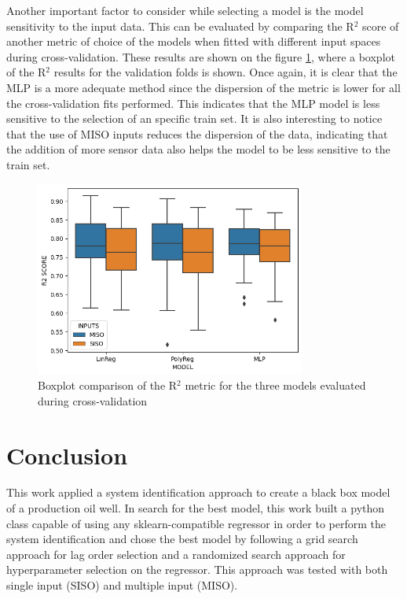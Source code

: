 \documentclass[conference]{IEEEtran}
\begin{document}
Another important factor to consider while selecting a model is the model sensitivity to the input data. This can be evaluated by comparing the R$^2$ score of another metric of choice of the models when fitted with different input spaces during cross-validation. These results are shown on the figure \ref{cv_stats}, where a boxplot of the R$^2$ results for the validation folds is shown. Once again, it is clear that the MLP is a more adequate method since the dispersion of the metric is lower for all the cross-validation fits performed. This indicates that the MLP model is less sensitive to the selection of an specific train set. It is also interesting to notice that the use of MISO inputs reduces the dispersion of the data, indicating that the addition of more sensor data also helps the model to be less sensitive to the train set.

\begin{figure}[htbp]
\centerline{\includegraphics[width=3.5in]{images/boxplot_cv.png}}
\caption{Boxplot comparison of the R$^2$ metric for the three models evaluated during cross-validation}
\label{cv_stats}
\end{figure}

\section{Conclusion}\label{section_conclusion}


This work applied a system identification approach to create a black box model of a production oil well. In search for the best model, this work built a python class capable of using any sklearn-compatible regressor in order to perform the system identification and chose the best model by following a grid search approach for lag order selection and a randomized search approach for hyperparameter selection on the regressor. This approach was tested with both single input (SISO) and multiple input (MISO).
\end{document}
